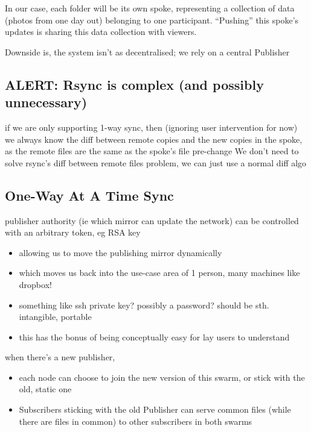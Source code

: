 \documentclass[12pt,a4paper,]{book}
\begin{document}
In our case, each folder will be its own spoke, representing a
collection of data (photos from one day out) belonging to one
participant. ``Pushing'' this spoke's updates is sharing this data
collection with viewers.

Downside is, the system isn't as decentralised; we rely on a central
Publisher

\subsection{ALERT: Rsync is complex (and possibly
unnecessary)}\label{alert-rsync-is-complex-and-possibly-unnecessary}

if we are only supporting 1-way sync, then (ignoring user intervention
for now) we always know the diff between remote copies and the new
copies in the spoke, as the remote files are the same as the spoke's
file pre-change We don't need to solve rsync's diff between remote files
problem, we can just use a normal diff algo

\subsection{One-Way At A Time Sync}\label{one-way-at-a-time-sync}

publisher authority (ie which mirror can update the network) can be
controlled with an arbitrary token, eg RSA key

\begin{itemize}
\itemsep1pt\parskip0pt
\item
  allowing us to move the publishing mirror dynamically
\item
  which moves us back into the use-case area of 1 person, many machines
  like dropbox!
\item
  something like ssh private key? possibly a password? should be sth.
  intangible, portable
\item
  this has the bonus of being conceptually easy for lay users to
  understand
\end{itemize}

when there's a new publisher,

\begin{itemize}
\itemsep1pt\parskip0pt
\item
  each node can choose to join the new version of this swarm, or stick
  with the old, static one
\item
  Subscribers sticking with the old Publisher can serve common files
  (while there are files in common) to other subscribers in both swarms
\end{itemize}
\end{document}

